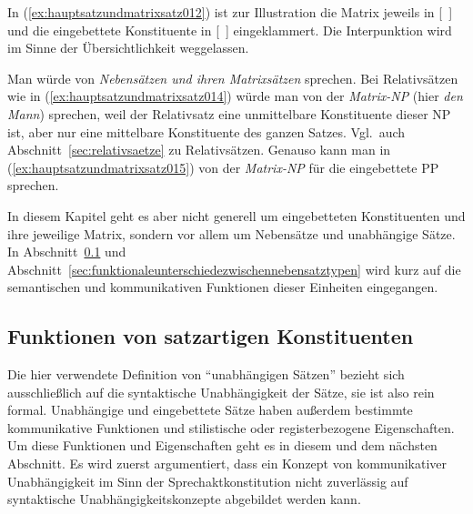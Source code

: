 In (\ref{ex:hauptsatzundmatrixsatz012}) ist zur Illustration die Matrix jeweils in [~] und die eingebettete Konstituente in [~] eingeklammert.
Die Interpunktion wird im Sinne der Übersichtlichkeit weggelassen.

\begin{exe}
  \ex\label{ex:hauptsatzundmatrixsatz012}
  \begin{xlist}
  \end{xlist}
\end{exe}

Man würde von \textit{Nebensätzen und ihren Matrixsätzen} sprechen.
Bei Relativsätzen wie in (\ref{ex:hauptsatzundmatrixsatz014}) würde man von der \textit{Matrix-NP} (hier \textit{den Mann}) sprechen, weil der Relativsatz eine unmittelbare Konstituente dieser NP ist, aber nur eine mittelbare Konstituente des ganzen Satzes.
Vgl.\ auch Abschnitt~\ref{sec:relativsaetze} zu Relativsätzen.
Genauso kann man in (\ref{ex:hauptsatzundmatrixsatz015}) von der \textit{Matrix-NP} für die eingebettete PP sprechen.

\begin{exe}
\end{exe}

In diesem Kapitel geht es aber nicht generell um eingebetteten Konstituenten und ihre jeweilige Matrix, sondern vor allem um Nebensätze und unabhängige Sätze.
In Abschnitt~\ref{sec:funktionenvonsatzartigenkonstituenten} und Abschnitt~\ref{sec:funktionaleunterschiedezwischennebensatztypen} wird kurz auf die semantischen und kommunikativen Funktionen dieser Einheiten eingegangen.


\subsection{Funktionen von satzartigen Konstituenten}
\label{sec:funktionenvonsatzartigenkonstituenten}


Die hier verwendete Definition von "`unabhängigen Sätzen"' bezieht sich ausschließlich auf die syntaktische Unabhängigkeit der Sätze, sie ist also rein formal.
Unabhängige und eingebettete Sätze haben außerdem bestimmte kommunikative Funktionen und stilistische oder registerbezogene Eigenschaften.
Um diese Funktionen und Eigenschaften geht es in diesem und dem nächsten Abschnitt.
Es wird zuerst argumentiert, dass ein Konzept von kommunikativer Unabhängigkeit im Sinn der Sprechaktkonstitution nicht zuverlässig auf syntaktische Unabhängigkeitskonzepte abgebildet werden kann.

